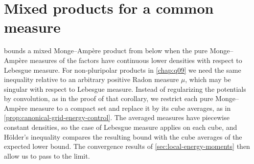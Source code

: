 \section{Mixed products for a common measure}
\label{sec:common-measure-mixed-products}
 bounds a mixed Monge--Amp\`ere product from below when the pure Monge--Amp\`ere measures of the factors have continuous lower densities with respect to Lebesgue measure. For non-pluripolar products in \cref{chap:q09} we need the same inequality relative to an arbitrary positive Radon measure $\mu$, which may be singular with respect to Lebesgue measure. Instead of regularizing the potentials by convolution, as in the proof of that corollary, we restrict each pure Monge--Amp\`ere measure to a compact set and replace it by its cube averages, as in \cref{prop:canonical-grid-energy-control}. The averaged measures have piecewise constant densities, so the case of Lebesgue measure applies on each cube, and H\"older's inequality compares the resulting bound with the cube averages of the expected lower bound. The convergence results of \cref{sec:local-energy-moments} then allow us to pass to the limit.

